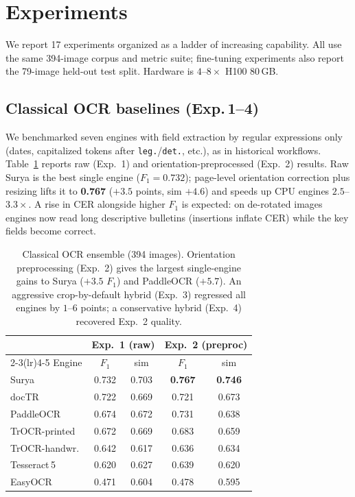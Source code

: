 \section{Experiments}
\label{sec:experiments}

We report 17 experiments organized as a ladder of increasing capability. All
use the same 394-image corpus and metric suite; fine-tuning experiments also
report the 79-image held-out test split. Hardware is $4$--$8\times$ H100 80\,GB.

\subsection{Classical OCR baselines (Exp.\,1--4)}
\label{sec:ocr}
We benchmarked seven engines with field extraction by regular expressions only
(dates, capitalized tokens after \texttt{leg.}/\texttt{det.}, etc.), as in
historical workflows. Table~\ref{tab:ocr} reports raw (Exp.~1) and
orientation-preprocessed (Exp.~2) results. Raw Surya is the best single engine
($F_1=0.732$); page-level orientation correction plus resizing lifts it to
\textbf{0.767} ($+3.5$ points, sim $+4.6$) and speeds up CPU engines
$2.5$--$3.3\times$. A rise in CER alongside higher $F_1$ is expected: on
de-rotated images engines now read long descriptive bulletins (insertions
inflate CER) while the key fields become correct.

\begin{table}[t]
\centering
\small
\setlength{\tabcolsep}{3pt}
\begin{tabular}{@{}lcccc@{}}
\toprule
& \multicolumn{2}{c}{Exp.~1 (raw)} & \multicolumn{2}{c}{Exp.~2 (preproc)} \\
\cmidrule(lr){2-3}\cmidrule(lr){4-5}
Engine & $F_1$ & sim & $F_1$ & sim \\
\midrule
Surya          & 0.732 & 0.703 & \textbf{0.767} & \textbf{0.746} \\
docTR          & 0.722 & 0.669 & 0.721 & 0.673 \\
PaddleOCR      & 0.674 & 0.672 & 0.731 & 0.638 \\
TrOCR-printed  & 0.672 & 0.669 & 0.683 & 0.659 \\
TrOCR-handwr.  & 0.642 & 0.617 & 0.636 & 0.634 \\
Tesseract\,5   & 0.620 & 0.627 & 0.639 & 0.620 \\
EasyOCR        & 0.471 & 0.604 & 0.478 & 0.595 \\
\bottomrule
\end{tabular}
\caption{Classical OCR ensemble (394 images). Orientation preprocessing
(Exp.~2) gives the largest single-engine gains to Surya ($+3.5$ $F_1$) and
PaddleOCR ($+5.7$). An aggressive crop-by-default hybrid (Exp.~3) regressed all
engines by $1$--$6$ points; a conservative hybrid (Exp.~4) recovered Exp.~2
quality.}
\label{tab:ocr}
\end{table}

